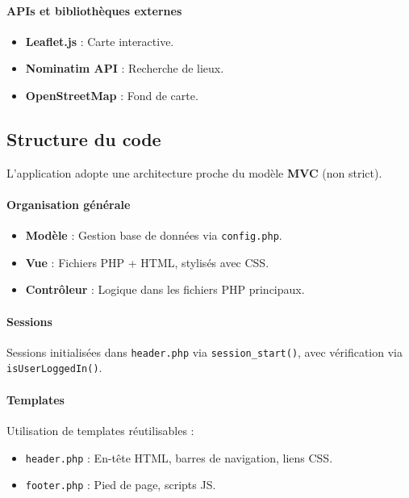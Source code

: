 \documentclass[a4paper,12pt]{article}
\begin{document}
\paragraph{APIs et bibliothèques externes}
\begin{itemize}
    \item \textbf{Leaflet.js} : Carte interactive.
    \item \textbf{Nominatim API} : Recherche de lieux.
    \item \textbf{OpenStreetMap} : Fond de carte.
\end{itemize}

\subsection{Structure du code}

L'application adopte une architecture proche du modèle \textbf{MVC} (non strict).

\paragraph{Organisation générale}
\begin{itemize}
    \item \textbf{Modèle} : Gestion base de données via \texttt{config.php}.
    \item \textbf{Vue} : Fichiers PHP + HTML, stylisés avec CSS.
    \item \textbf{Contrôleur} : Logique dans les fichiers PHP principaux.
\end{itemize}

\paragraph{Sessions}
Sessions initialisées dans \texttt{header.php} via \texttt{session\_start()}, avec vérification via \texttt{isUserLoggedIn()}.

\paragraph{Templates}
Utilisation de templates réutilisables :
\begin{itemize}
    \item \texttt{header.php} : En-tête HTML, barres de navigation, liens CSS.
    \item \texttt{footer.php} : Pied de page, scripts JS.
\end{itemize}
\end{document}
